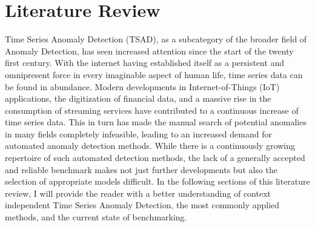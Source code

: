\documentclass[12pt,oneside]{article}
\begin{document}
\section{Literature Review} \label{einleitung}
Time Series Anomaly Detection (TSAD), as a subcategory of the broader field of Anomaly Detection, has seen increased attention since the start of the twenty first century. With the internet having established itself as a persistent and omnipresent force in every imaginable aspect of human life, time series data can be found in abundance. Modern developments in Internet-of-Things (IoT) applications, the digitization of financial data, and a massive rise in the consumption of streaming services have contributed to a continuous increase of time series data. This in turn has made the manual search of potential anomalies in many fields completely infeasible, leading to an increased demand for automated anomaly detection methods. While there is a continuously growing repertoire of such automated detection methods, the lack of a generally accepted and reliable benchmark makes not just further developments but also the selection of appropriate models difficult. In the following sections of this literature review, I will provide the reader with a better understanding of context independent Time Series Anomaly Detection, the most commonly applied methods, and the current state of benchmarking.
\end{document}
